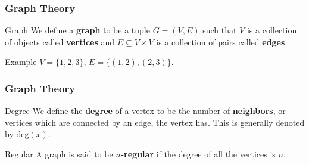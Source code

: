 \documentclass[svgnames,english]{beamer} %
\begin{document}
\begin{frame}
\frametitle{Graph Theory}
\begin{block}{Graph}
We define a \textbf{graph} to be a tuple $G = (V, E)$ such that $V$ is a collection of objects called \textbf{vertices} and $E \subseteq V \times V$ is a collection of pairs called \textbf{edges}.
\end{block} 

\begin{block}{Example}
$V = \{1, 2, 3\}$, $E = \{(1,2), (2,3)\}$.
\begin{center}
\end{center}
\end{block}
\end{frame}

\begin{frame}
\frametitle{Graph Theory}
\begin{block}{Degree}
We define the \textbf{degree} of a vertex to be the number of \textbf{neighbors}, or vertices which are connected by an edge, the vertex has. This is generally denoted by $\text{deg}(x)$.
\end{block} 

\begin{block}{Regular}
A graph is said to be \textbf{$n$-regular} if the degree of all the vertices is $n$.
\end{block}
\end{frame}
\end{document}

